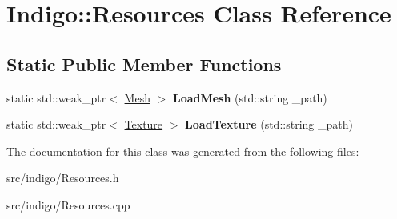 \hypertarget{class_indigo_1_1_resources}{}\section{Indigo\+:\+:Resources Class Reference}
\label{class_indigo_1_1_resources}
\subsection*{Static Public Member Functions}
\begin{DoxyCompactItemize}
\item 
\mbox{\label{class_indigo_1_1_resources_a9d8d90a5ba63fb7350297d9411c525eb}} 
static std\+::weak\+\_\+ptr$<$ \hyperlink{class_indigo_1_1_mesh}{Mesh} $>$ {\bfseries Load\+Mesh} (std\+::string \+\_\+path)
\item 
\mbox{\label{class_indigo_1_1_resources_ac20ba3ff718bd9f6233d68976dfc4f64}} 
static std\+::weak\+\_\+ptr$<$ \hyperlink{class_indigo_1_1_texture}{Texture} $>$ {\bfseries Load\+Texture} (std\+::string \+\_\+path)
\end{DoxyCompactItemize}


The documentation for this class was generated from the following files\+:\begin{DoxyCompactItemize}
\item 
src/indigo/Resources.\+h\item 
src/indigo/Resources.\+cpp\end{DoxyCompactItemize}
